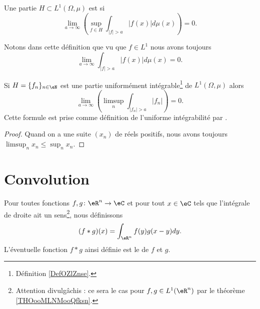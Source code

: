 \begin{definition}  \label{DefOZlZnse}
	Une partie \( H\subset L^1(\Omega,\mu)\) est  si
	\begin{equation}
		\lim_{a\to \infty}\left( \sup_{f\in H}\int_{  | f |>a   }| f(x) |d\mu(x) \right)=0.
	\end{equation}
\end{definition}
Notons dans cette définition que vu que \( f\in L^1\) nous avons toujours
\begin{equation}
	\lim_{a\to \infty}\int_{| f |>a}| f(x) |d\mu(x)=0.
\end{equation}

\begin{lemma}	\label{LEMooUOQDooIkVyWm}
	Si \( H=\{ f_n \}_{n\in \eN}\) est une partie uniformément intégrable\footnote{Définition \ref{DefOZlZnse}.} de \( L^1(\Omega,\mu)\) alors
	\begin{equation}
		\lim_{a\to \infty}\left(   \limsup_n\int_{| f_n |>a}| f_n |  \right)=0.
	\end{equation}
	Cette formule est prise comme définition de l'uniforme intégrabilité par \cite{BIBvitali2}.
\end{lemma}

\begin{proof}
	Quand on a une suite \( (x_n)\) de réels positifs, nous avons toujours \( \limsup_nx_n\leq \sup_nx_n \).
\end{proof}

\section{Convolution}


\begin{definition}      \label{DEFooHHCMooHzfStu}
	Pour toutes fonctions \( f,g\colon \eR^n\to \eC\) et pour tout \( x\in \eC\) tels que l'intégrale de droite ait un sens\footnote{Attention divulgâchis : ce sera le cas pour \( f,g\in L^1(\eR^n)\) par le théorème \ref{THOooMLNMooQfksn}.}, nous définissons
	\begin{equation}
		(f*g)(x)=\int_{\eR^n} f(y)g(x-y)dy.
	\end{equation}
	L'éventuelle fonction \( f*g\) ainsi définie est le  de \( f\) et \( g\).
\end{definition}

